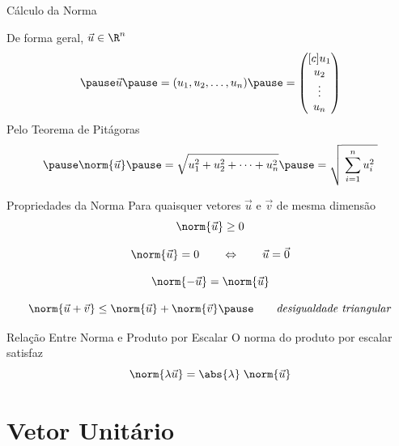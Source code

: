 \documentclass[fleqn,aspectratio=169,12pt]{beamer}
\begin{document}
\begin{frame}[t]{Cálculo da Norma}
  \vspace{1\baselineskip}

  De forma geral, $\vec{u} \in \R^n$
  \[
    \pause
    \vec{u}
    \pause
    = ( u_1, u_2, \dots, u_n )
    \pause
    = \begin{pmatrix}[c]
      u_1 \\
      u_2 \\
      \vdots \\
      u_n
    \end{pmatrix}
  \]
  \pause
  Pelo Teorema de Pitágoras
  \[
    \pause
    \norm{\vec{u}}
    \pause
    = \sqrt{ u_1^2 + u_2^2 + \cdots + u_n^2 }
    \pause
    = \sqrt{ \; \sum_{i=1}^{n} u_i^2 \; }
  \]
\end{frame}



\begin{frame}{Propriedades da Norma}
  Para quaisquer vetores $\vec{u}$ e $\vec{v}$ de mesma dimensão
  \pause
  \[
    \norm{\vec{u}} \geq 0
  \]

  \pause
  \[
    \norm{\vec{u}} = 0
    \qquad\Leftrightarrow\qquad
    \vec{u} = \vec{0}
  \]

  \pause
  \[
    \norm{-\vec{u}} = \norm{\vec{u}}
  \]

  \pause
  \[
    \norm{\vec{u}+\vec{v}}
    \leq
    \norm{\vec{u}} + \norm{\vec{v}}
    \pause
    \qquad
    \text{\emph{desigualdade triangular}}
  \]
\end{frame}

\begin{frame}{Relação Entre Norma e Produto por Escalar}
  O norma do produto por escalar satisfaz
  \[
    \norm{\lambda\vec{u}} = \abs{\lambda} \; \norm{\vec{u}}
  \]
\end{frame}




\section{Vetor Unitário}
\end{document}
